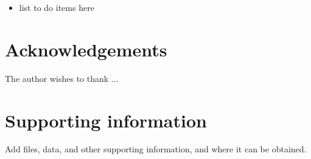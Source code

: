 \documentclass[10pt, letterpaper, twoside]{article}
\theoremstyle{myenv}
\theoremstyle{mytheorem}
\theoremstyle{mydefinition}
\begin{document}
\begin{itemize}
    \item list to do items here
\end{itemize}

\newpage
\listoffigures

\newpage
\listoftables

\newpage
\listofmyequations

\newpage
\listofmytheorems

\newpage
\listofmydefinitions

\newpage
\listofmycorollaries

\newpage
\listofmylemmas

\newpage
\listofmypropositions

\newpage
\section{Acknowledgements}
\label{sec:acknowledgements}

The author wishes to thank ...

\section{Supporting information}
\label{sec:supporting_information}

Add files, data, and other supporting information, and where it can be obtained.

\newpage
\nocite{*}


\end{document}

